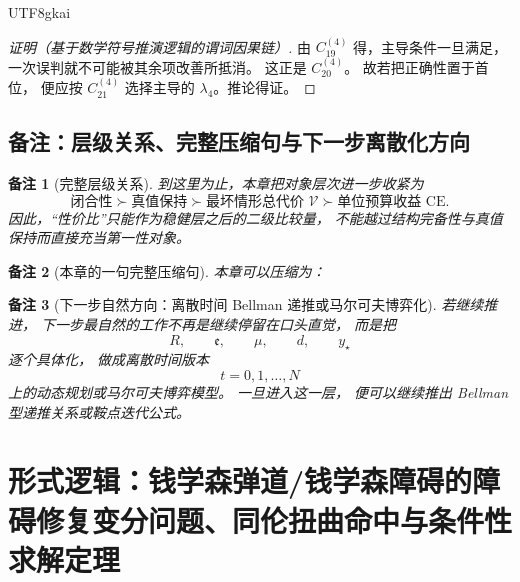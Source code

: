 \documentclass[12pt]{article}
\newtheorem{remark}{备注}[section]
\begin{document}
\begin{CJK*}{UTF8}{gkai}
\begin{proof}[证明（基于数学符号推演逻辑的谓词因果链）]
由 \(C^{(4)}_{19}\) 得，主导条件一旦满足，
一次误判就不可能被其余项改善所抵消。
这正是 \(C^{(4)}_{20}\)。
故若把正确性置于首位，
便应按 \(C^{(4)}_{21}\) 选择主导的 \(\lambda_4\)。推论得证。
\end{proof}

\subsection{备注：层级关系、完整压缩句与下一步离散化方向}
\label{subsec:tex1-ch4-remarks}

\begin{remark}[完整层级关系]
到这里为止，本章把对象层次进一步收紧为
\[
  \text{闭合性}
  \succ
  \text{真值保持}
  \succ
  \text{最坏情形总代价 }\mathcal V
  \succ
  \text{单位预算收益 }\mathrm{CE}.
\]
因此，“性价比”只能作为稳健层之后的二级比较量，
不能越过结构完备性与真值保持而直接充当第一性对象。
\end{remark}

\begin{remark}[本章的一句完整压缩句]
本章可以压缩为：
\begin{center}
\end{center}
\end{remark}

\begin{remark}[下一步自然方向：离散时间 Bellman 递推或马尔可夫博弈化]
若继续推进，
下一步最自然的工作不再是继续停留在口头直觉，
而是把
\[
  R,\qquad \mathfrak e,\qquad \mu,\qquad d,\qquad y_\star
\]
逐个具体化，
做成离散时间版本
\[
  t=0,1,\dots,N
\]
上的动态规划或马尔可夫博弈模型。
一旦进入这一层，
便可以继续推出 Bellman 型递推关系或鞍点迭代公式。
\end{remark}

\clearpage
\section{形式逻辑：钱学森弹道/钱学森障碍的障碍修复变分问题、同伦扭曲命中与条件性求解定理}
\label{sec:tex1-ch5}


\end{CJK*}
\end{document}
